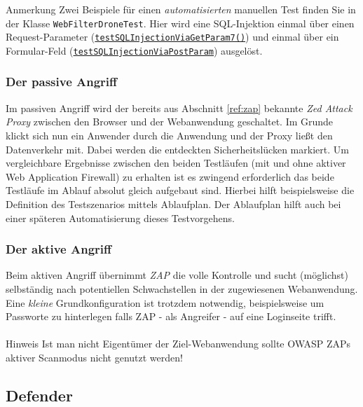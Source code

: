 \textcolor{bhtGray}{ Anmerkung} Zwei Beispiele für einen \glqq\emph{automatisierten}\grqq{} manuellen Test finden Sie in der Klasse \verb=WebFilterDroneTest=. Hier wird eine SQL-Injektion einmal über einen Request-Parameter (\href{https://github.com/devtty/webcastellum/blob/3c45a017e2aa17e553d2517308210ab7bf614904/src/test/java/org/webcastellum/test/WebFilterDroneTest.java#L88}{\verb=testSQLInjectionViaGetParam7()=}) und einmal über ein Formular-Feld (\href{https://github.com/devtty/webcastellum/blob/3c45a017e2aa17e553d2517308210ab7bf614904/src/test/java/org/webcastellum/test/WebFilterDroneTest.java#L121}{\verb=testSQLInjectionViaPostParam=}) ausgelöst.


\subsubsection{Der passive Angriff}
Im passiven Angriff wird der bereits aus Abschnitt \ref{ref:zap} bekannte \emph{Zed Attack Proxy} zwischen den Browser und der Webanwendung geschaltet. Im Grunde klickt sich nun ein Anwender durch die Anwendung und der Proxy ließt den Datenverkehr mit. Dabei werden die entdeckten Sicherheitslücken markiert. Um vergleichbare Ergebnisse zwischen den beiden Testläufen (mit und ohne aktiver Web Application Firewall) zu erhalten ist es zwingend erforderlich das beide Testläufe im Ablauf absolut gleich aufgebaut sind. Hierbei hilft beispielsweise die Definition des Testszenarios mittels Ablaufplan. Der Ablaufplan hilft auch bei einer späteren Automatisierung dieses Testvorgehens.

\subsubsection{Der aktive Angriff}
Beim aktiven Angriff übernimmt \emph{ZAP} die volle Kontrolle und sucht (möglichst) selbständig nach potentiellen Schwachstellen in der zugewiesenen Webanwendung. Eine \emph{kleine} Grundkonfiguration ist trotzdem notwendig, beispielsweise um Passworte zu hinterlegen falls ZAP - als Angreifer - auf eine Loginseite trifft. \\\\
\textcolor{bhtGray}{ Hinweis} Ist man nicht Eigentümer der Ziel-Webanwendung sollte OWASP ZAPs aktiver Scanmodus nicht genutzt werden!\\


\subsection{Defender}

